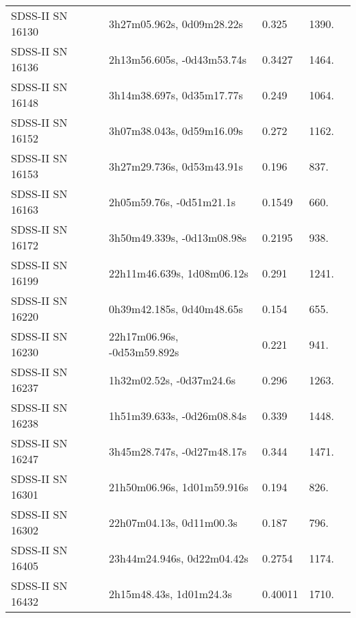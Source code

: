 \begin{longtable}{lllll}
 SDSS-II SN 16130 &      3h27m05.962s, 0d09m28.22s &    0.325 &          1390. &    \citet{2010ApJ...713.1026D} \\
 SDSS-II SN 16136 &     2h13m56.605s, -0d43m53.74s &   0.3427 &          1464. &    \citet{2011ApJ...738..162S} \\
 SDSS-II SN 16148 &      3h14m38.697s, 0d35m17.77s &    0.249 &          1064. &    \citet{2011ApJ...738..162S} \\
 SDSS-II SN 16152 &      3h07m38.043s, 0d59m16.09s &    0.272 &          1162. &    \citet{2011ApJ...738..162S} \\
 SDSS-II SN 16153 &      3h27m29.736s, 0d53m43.91s &    0.196 &           837. &    \citet{2011ApJ...738..162S} \\
 SDSS-II SN 16163 &       2h05m59.76s, -0d51m21.1s &   0.1549 &           660. &    \citet{2011ApJ...738..162S} \\
 SDSS-II SN 16172 &     3h50m49.339s, -0d13m08.98s &   0.2195 &           938. &    \citet{2011ApJ...738..162S} \\
 SDSS-II SN 16199 &     22h11m46.639s, 1d08m06.12s &    0.291 &          1241. &    \citet{2011ApJ...738..162S} \\
 SDSS-II SN 16220 &      0h39m42.185s, 0d40m48.65s &    0.154 &           655. &    \citet{2011ApJ...738..162S} \\
 SDSS-II SN 16230 &    22h17m06.96s, -0d53m59.892s &    0.221 &           941. &    \citet{2011ApJ...738..162S} \\
 SDSS-II SN 16237 &       1h32m02.52s, -0d37m24.6s &    0.296 &          1263. &    \citet{2010ApJ...713.1026D} \\
 SDSS-II SN 16238 &     1h51m39.633s, -0d26m08.84s &    0.339 &          1448. &    \citet{2010ApJ...713.1026D} \\
 SDSS-II SN 16247 &     3h45m28.747s, -0d27m48.17s &    0.344 &          1471. &    \citet{2011ApJ...738..162S} \\
 SDSS-II SN 16301 &     21h50m06.96s, 1d01m59.916s &    0.194 &           826. &    \citet{2011ApJ...738..162S} \\
 SDSS-II SN 16302 &       22h07m04.13s, 0d11m00.3s &    0.187 &           796. &    \citet{2010ApJ...713.1026D} \\
 SDSS-II SN 16405 &     23h44m24.946s, 0d22m04.42s &   0.2754 &          1174. &    \citet{2011ApJ...738..162S} \\
 SDSS-II SN 16432 &        2h15m48.43s, 1d01m24.3s &  0.40011 &          1710. &    \citet{2016SDSSD.C...0000:} \\

\end{longtable}
